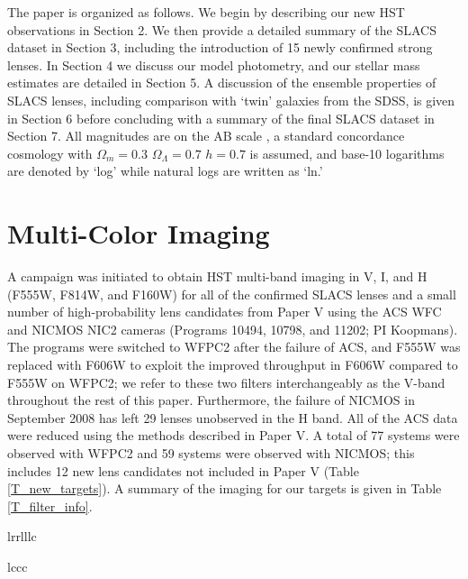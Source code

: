 \documentclass[iop]{emulateapj}
\begin{document}
The paper is organized as follows.  We begin by describing our new HST
observations in Section 2. We then provide a detailed summary of the
SLACS dataset in Section 3, including the introduction of 15 newly
confirmed strong lenses. In Section 4 we discuss our model photometry,
and our stellar mass estimates are detailed in Section 5. A discussion
of the ensemble properties of SLACS lenses, including comparison with
`twin' galaxies from the SDSS, is given in Section 6 before concluding
with a summary of the final SLACS dataset in Section 7. All magnitudes
are on the AB scale \citep{oke}, a standard concordance cosmology with
$\Omega_{m}=0.3$ $\Omega_{\Lambda}=0.7$ $h=0.7$ is assumed, and base-10
logarithms are denoted by `log' while natural logs are written as `ln.'


\section{Multi-Color Imaging}
A campaign was initiated to obtain HST multi-band imaging in V, I, and
H (F555W, F814W, and F160W) for all of the confirmed SLACS lenses and
a small number of high-probability lens candidates from Paper V using the
ACS WFC and NICMOS NIC2 cameras (Programs 10494, 10798, and 11202; PI
Koopmans). The programs were switched to WFPC2 after the failure of
ACS, and F555W was replaced with F606W to exploit the improved
throughput in F606W compared to F555W on WFPC2; we refer to these two
filters interchangeably as the V-band throughout the rest of this paper.
Furthermore, the failure of NICMOS in September 2008 has left 29 lenses
unobserved in the H band. All of the ACS data were reduced using the methods
described in Paper V. A total of 77 systems were observed with WFPC2 and 59
systems were observed with NICMOS; this includes 12 new lens candidates not
included in Paper V (Table \ref{T_new_targets}). A summary of the
imaging for our targets is given in Table \ref{T_filter_info}. 

\begin{deluxetable*}{lrrlllc}
\tabletypesize{\scriptsize}
\tablewidth{0pc}
\startdata

\enddata
\label{T_new_targets}
\end{deluxetable*}


\begin{deluxetable}{lccc}
 \tabletypesize{\scriptsize}
 \tablewidth{0pc}
\startdata

\enddata
 \label{T_filter_info}
\end{deluxetable}
\end{document}
